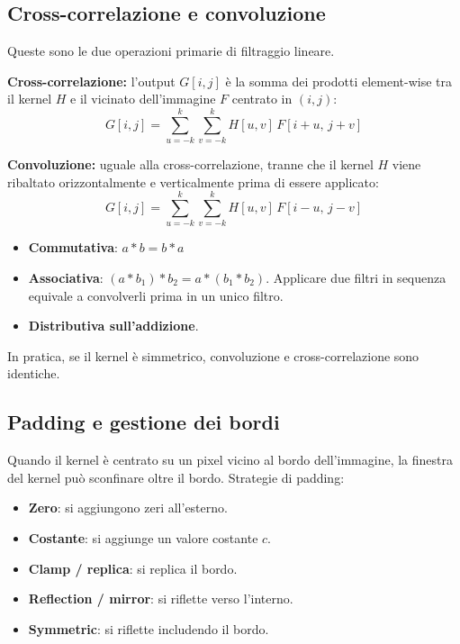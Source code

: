 \documentclass[12pt, a4paper]{report}
\begin{document}
\subsection{Cross-correlazione e convoluzione}

Queste sono le due operazioni primarie di filtraggio lineare.

\textbf{Cross-correlazione:} l'output $G[i,j]$ è la somma dei prodotti element-wise
tra il kernel $H$ e il vicinato dell'immagine $F$ centrato in $(i,j)$:
\[
  G[i,j] = \sum_{u=-k}^{k}\sum_{v=-k}^{k} H[u,v]\,F[i+u,\,j+v]
\]

\textbf{Convoluzione:} uguale alla cross-correlazione, tranne che il kernel $H$
viene ribaltato orizzontalmente e verticalmente prima di essere applicato:
\[
  G[i,j] = \sum_{u=-k}^{k}\sum_{v=-k}^{k} H[u,v]\,F[i-u,\,j-v]
\]

\begin{propbox}
\begin{itemize}
  \item \textbf{Commutativa}: $a*b = b*a$
  \item \textbf{Associativa}: $(a*b_1)*b_2 = a*(b_1*b_2)$.
        Applicare due filtri in sequenza equivale a convolverli prima in un unico
        filtro.
  \item \textbf{Distributiva sull'addizione}.
\end{itemize}
In pratica, se il kernel è simmetrico, convoluzione e cross-correlazione sono
identiche.
\end{propbox}

\subsection{Padding e gestione dei bordi}

Quando il kernel è centrato su un pixel vicino al bordo dell'immagine, la finestra
del kernel può sconfinare oltre il bordo.  Strategie di padding:

\begin{itemize}
  \item \textbf{Zero}: si aggiungono zeri all'esterno.
  \item \textbf{Costante}: si aggiunge un valore costante $c$.
  \item \textbf{Clamp / replica}: si replica il bordo.
  \item \textbf{Reflection / mirror}: si riflette verso l'interno.
  \item \textbf{Symmetric}: si riflette includendo il bordo.
\end{itemize}
\end{document}
